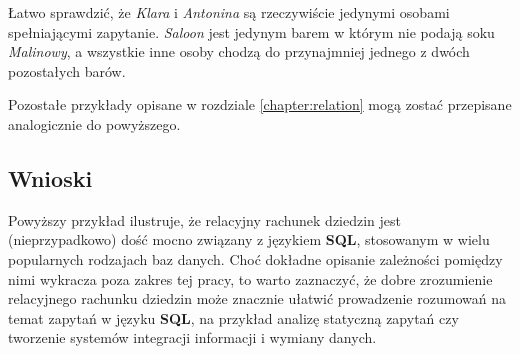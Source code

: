 \begin{example}
    Łatwo sprawdzić, że \textit{Klara} i \textit{Antonina} są rzeczywiście jedynymi osobami spełniającymi zapytanie. \textit{Saloon} jest jedynym barem w którym nie podają soku \textit{Malinowy}, a wszystkie inne osoby chodzą do przynajmniej jednego z dwóch pozostałych barów.
\end{example}

Pozostałe przykłady opisane w rozdziale \ref{chapter:relation} mogą zostać przepisane analogicznie do powyższego.

\subsection{Wnioski}
Powyższy przykład ilustruje, że relacyjny rachunek dziedzin jest (nieprzypadkowo) dość mocno związany z językiem \textbf{SQL}, stosowanym w wielu popularnych rodzajach baz danych. Choć dokładne opisanie zależności pomiędzy nimi wykracza poza zakres tej pracy, to warto zaznaczyć, że dobre zrozumienie relacyjnego rachunku dziedzin może znacznie ułatwić prowadzenie rozumowań na temat zapytań w języku \textbf{SQL}, na przykład analizę statyczną zapytań czy tworzenie systemów integracji informacji i wymiany danych.